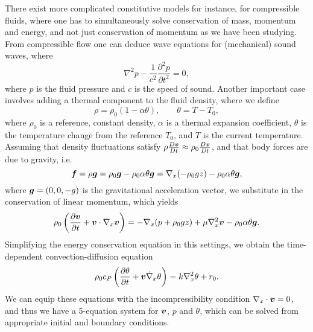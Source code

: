\documentclass{article}
\renewcommand{\vec}{\vectorsym}
\newcommand{\vx}{\nabla_x}
\begin{document}
There exist more complicated constitutive models for instance, for compressible fluids, where one has to simultaneously solve conservation of mass, momentum and energy, and not just conservation of momentum as we have been studying. From compressible flow one can deduce wave equations for (mechanical) sound waves, where 
\begin{equation*}
    \nabla^2 p - \frac{1}{c^2}\frac{\partial^2 p}{\partial t^2} = 0,
\end{equation*}
where $p$ is the fluid pressure and $c$ is the speed of sound. Another important case involves adding a thermal component to the fluid density, where we define 
\begin{equation*}
    \rho = \rho_0 (1-\alpha \theta),\qquad \theta = T - T_0,
\end{equation*}
where $\rho_0$ is a reference, constant density, $\alpha$ is a thermal expansion coefficient, $\theta$ is the temperature change from the reference $T_0$, and $T$ is the current temperature. Assuming that density fluctuations satisfy $\rho\frac{D\vec v}{Dt}\approx \rho_0\frac{D\vec v}{Dt}$, and that body forces are due to gravity, i.e.
\begin{equation*}
    \vec f = \rho\vec g = \rho_0\vec g - \rho_0\alpha\theta \vec g = \vx(-\rho_0 g z) - \rho_0\alpha\theta\vec g,
\end{equation*}
where $\vec g = (0,0,-g)$ is the gravitational acceleration vector, we substitute in the conservation of linear momentum, which yields 
\begin{equation*}
    \rho_0\left(\frac{\partial\vec v}{\partial t}+\vec v \cdot\vx\vec v\right) = -\vx(p+\rho_0 g z) + \mu\vx^2\vec v - \rho_0 \alpha  \theta\vec g.
\end{equation*} 
Simplifying the energy conservation equation in this settings, we obtain the time-dependent convection-diffusion equation 
\begin{equation*}
    \rho_0 c_P\left(\frac{\partial \theta}{\partial t} + \vec v \dot\vx\theta\right) = k\vx^2\theta + r_0.
\end{equation*}
We can equip these equations with the incompressibility condition $\vx\cdot\vec v = 0$, and thus we have a 5-equation system for $\vec v$, $p$ and $\theta$, which can be solved from appropriate initial and boundary conditions. 
\end{document}
